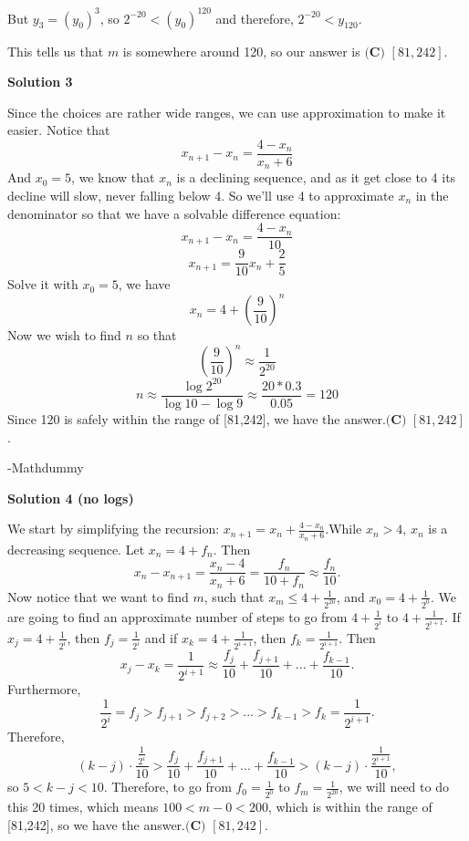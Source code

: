 \begin{enumerate}
 But $y_3 = (y_0)^3$, so $2^{-20} < (y_0)^{120}$ and therefore, $2^{-20} < y_{120}$.

 This tells us that $m$ is somewhere around 120, so our answer is $\boxed{\textbf{(C) } [81,242]}$.

 



\textbf{Solution 3}

Since the choices are rather wide ranges, we can use approximation to make it easier. Notice that
 \[x_{n+1} - x_n = \frac{4-x_n}{x_n+6}\]And $x_0 =5$, we know that $x_n$ is a declining sequence, and as it get close to 4 its decline will slow, never falling below 4. So we'll use 4 to approximate $x_n$ in the denominator so that we have a solvable difference equation:
 \[x_{n+1} - x_n = \frac{4-x_n}{10}\]
 \[x_{n+1} = \frac{9}{10}x_n + \frac{2}{5}\]Solve it with $x_0 = 5$, we have
 \[x_n = 4 + (\frac{9}{10})^n\]Now we wish to find $n$ so that
 \[(\frac{9}{10})^n \approx \frac{1}{2^{20}}\]
 \[n \approx \frac{\log{2^{20}}}{\log{10}-\log9} \approx \frac{20*0.3}{0.05} = 120\]Since 120 is safely within the range of [81,242], we have the answer.$\boxed{\textbf{(C) } [81,242]}$.

 -Mathdummy

 



\textbf{Solution 4 (no logs)}

We start by simplifying the recursion: $x_{n+1} = x_n + \frac{4-x_n}{x_n+6}$.While $x_n > 4$, $x_n$ is a decreasing sequence. Let $x_n = 4 + f_n$. Then 
 \[x_{n} - x_{n+1} = \frac{x_n-4}{x_n+6} = \frac{f_n}{10 + f_n} \approx \frac{f_n}{10}.\]Now notice that we want to find $m$, such that $x_m \leq 4 + \frac{1}{2^{20}}$, and $x_0 = 4 + \frac{1}{2^0}$. We are going to find an approximate number of steps to go from $4 + \frac{1}{2^i}$ to $4 + \frac{1}{2^{i+1}}$. If $x_j = 4 + \frac{1}{2^i}$, then $f_j = \frac{1}{2^i}$ and if $x_k = 4 + \frac{1}{2^{i+1}}$, then $f_k = \frac{1}{2^{i+1}}$. Then 
 \[x_j - x_k = \frac{1}{2^{i+1}} \approx \frac{f_j}{10} + \frac{f_{j+1}}{10} + ... + \frac{f_{k-1}}{10}.\]Furthermore, 
 \[\frac{1}{2^i} = f_j > f_{j+1} > f_{j+2} > ... > f_{k-1} > f_k = \frac{1}{2^{i+1}}.\] Therefore, 
 \[(k-j) \cdot \frac{\frac{1}{2^i}}{10} > \frac{f_j}{10} + \frac{f_{j+1}}{10} + ... + \frac{f_{k-1}}{10} > (k-j) \cdot \frac{\frac{1}{2^{i+1}}}{10},\] so $5 < k-j < 10$. Therefore, to go from $f_0 = \frac{1}{2^0}$ to $f_m = \frac{1}{2^{20}}$, we will need to do this 20 times, which means $100 < m - 0 < 200$, which is within the range of [81,242], so we have the answer.$\boxed{\textbf{(C) } [81,242]}$.


\end{enumerate}
